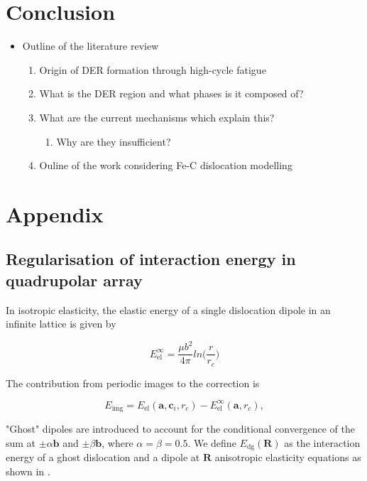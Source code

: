\documentclass[a4paper,11pt]{article}
\begin{document}
\section{Conclusion}
\label{sec:org69d1142}


\begin{itemize}
\item Outline of the literature review 
\begin{enumerate}
\item Origin of DER formation through high-cycle fatigue
\item What is the DER region and what phases is it composed of?
\item What are the current mechanisms which explain this?
\begin{enumerate}
\item Why are they insufficient?
\end{enumerate}
\item Ouline of the work considering Fe-C dislocation modelling
\end{enumerate}
\end{itemize}

\section{Appendix}
\label{sec:org6be659e}

\subsection{Regularisation of interaction energy in quadrupolar array}
\label{sec:orge7548a7}
\label{sec:Ainteractionenergy}


In isotropic elasticity, the elastic energy of a single dislocation dipole in an
infinite lattice is given by


\[ E_{\text{el}}^{\infty} = \frac{\mu b^2}{4\pi} ln \big( \frac{r}{r_{c}} \big)  \]

The contribution from periodic images to the correction is 

\[ E_{\text{img} } = E_{\text{el}} (\mathbf{a}, \mathbf{c}_i , r_c) - E_{\text{el}}^{\infty}
   (\mathbf{a}, r_c),\]

"Ghost" dipoles are introduced to account for the conditional convergence of the sum at \(\pm\alpha
   \mathbf{b}\) and \(\pm \beta\mathbf{b}\), where \(\alpha = \beta = 0.5\). We define \(E_{\text{dg}} (\mathbf{R})\) as the
interaction energy of a ghost dislocation and a dipole at \(\mathbf{R}\) anisotropic elasticity
equations as shown in \cite{Cai2003}.
\end{document}

